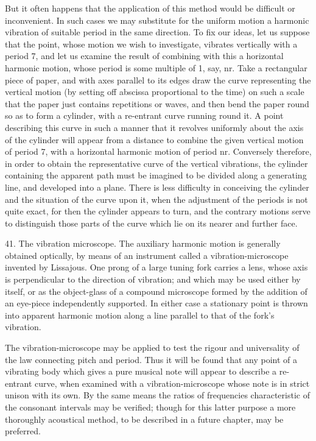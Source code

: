 But it often happens that the application of this method would be difficult or
inconvenient. In such cases we may substitute for the uniform motion a harmonic
vibration of suitable period in the same direction. To fix our ideas, let us
suppose that the point, whose motion we wish to investigate, vibrates
vertically with a period 7, and let us examine the result of combining with
this a horizontal harmonic motion, whose period is some multiple of 1, say, nr.
Take a rectangular piece of paper, and with axes parallel to its edges draw the
curve representing the vertical motion (by setting off abscissa proportional to
the time) on such a scale that the paper just contains repetitions or waves,
and then bend the paper round so as to form a cylinder, with a re-entrant curve
running round it. A point describing this curve in such a manner that it
revolves uniformly about the axis of the cylinder will appear from a distance
to combine the given vertical motion of period 7, with a horizontal harmonic
motion of period nr. Conversely therefore, in order to obtain the
representative curve of the vertical vibrations, the cylinder containing the
apparent path must be imagined to be divided along a generating line, and
developed into a plane. There is less difficulty in conceiving the cylinder and
the situation of the curve upon it, when the adjustment of the periods is not
quite exact, for then the cylinder appears to turn, and the contrary motions
serve to distinguish those parts of the curve which lie on its nearer and
further face.

41. The vibration microscope.  The auxiliary harmonic motion is generally
obtained optically, by means of an instrument called a vibration-microscope
invented by Lissajous. One prong of a large tuning fork carries a lens, whose
axis is perpendicular to the direction of vibration; and which may be used
either by itself, or as the object-glass of a compound microscope formed by the
addition of an eye-piece independently supported. In either case a stationary
point is thrown into apparent harmonic motion along a line parallel to that of
the fork's vibration.

The vibration-microscope may be applied to test the rigour and universality of
the law connecting pitch and period. Thus it will be found that any point of a
vibrating body which gives a pure musical note will appear to describe a
re-entrant curve, when examined with a vibration-microscope whose note is in
strict unison with its own. By the same means the ratios of frequencies
characteristic of the consonant intervals may be verified; though for this
latter purpose a more thoroughly acoustical method, to be described in a future
chapter, may be preferred.

